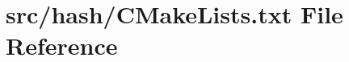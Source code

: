 \hypertarget{hash_2CMakeLists_8txt}{}\section{src/hash/\+C\+Make\+Lists.txt File Reference}
\label{hash_2CMakeLists_8txt}
